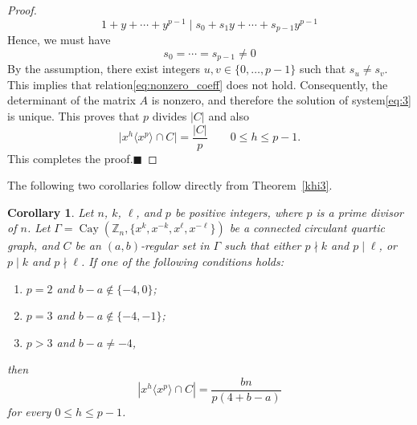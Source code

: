 \documentclass[12pt]{article}
\newtheorem{cor}[formula]{Corollary}
\begin{document}
\begin{proof}
		\[
		1 + y + \cdots + y^{p-1} \mid s_0 + s_1 y + \cdots + s_{p-1} y^{p-1}
		\]
		Hence, we must have
		\begin{equation}\label{eq:nonzero_coeff}
			s_0 = \cdots = s_{p-1} \neq 0
		\end{equation}
		By the assumption, there exist integers $u, v \in \{0, \dots, p-1\}$ such that $s_u \neq s_v$. This implies that relation\eqref{eq:nonzero_coeff} does not hold. Consequently, the determinant of the matrix $A$ is nonzero, and therefore the solution of system\eqref{eq:3} is unique.
	    This proves that \(p\) divides \(|C|\) and also
		\[
		\lvert x^{h}\langle x^{p}\rangle \cap C\rvert = \frac{|C|}{p} \qquad 0 \le h \le p-1.
		\]
	 This completes the proof.\hfill$\blacksquare$	
		\end{proof}	
The following two corollaries follow directly from Theorem~\ref{khi3}.	
\begin{cor}\label{cor:coset-size}
	Let $n$, $k$, $\ell$, and $p$ be positive integers, where $p$ is a prime divisor of $n$. Let $\Gamma=\operatorname{Cay}(\mathbb{Z}_n,\{x^k,x^{-k},x^\ell,x^{-\ell}\})$ be a connected circulant quartic graph, and $C$ be an $(a,b)$-regular set in $\Gamma$ such that either $p\nmid k$ and $p\mid \ell$, or $p\mid k$ and $p\nmid \ell$. If one of the following conditions holds:
	\begin{enumerate}
		\item[(i)] $p=2$ and $b-a\notin\{-4,0\}$;
		\item[(ii)] $p=3$ and $b-a\notin\{-4,-1\}$;
		\item[(iii)] $p>3$ and $b-a\neq -4$,
	\end{enumerate}
	then
\[
\left|x^h\langle x^p\rangle\cap C\right|
=\frac{bn}{p(4+b-a)}
\]
for every $0\le h\le p-1$.
\end{cor}
\end{document}
